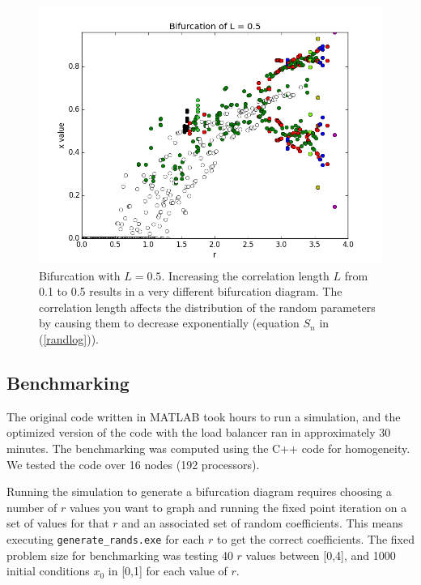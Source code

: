 \documentclass[12pt]{article}
\begin{document}
 \begin{figure}[H]
	\begin{center}
		\includegraphics[scale=0.5]{Bifurcation_L5}
\caption{Bifurcation with $L=0.5$. Increasing the correlation length
  $L$ from 0.1 to 0.5 results in a very different bifurcation
  diagram. The correlation length affects the distribution of the
  random parameters by causing them to decrease exponentially
  (equation $S_n$ in (\ref{randlog})).}\label{lb_bif_5}
	\end{center}
\end{figure}

\subsection{Benchmarking}
\hspace{5mm} The original code written in MATLAB took hours to run a
simulation, and the optimized version of the code with the load
balancer ran in approximately 30 minutes. The benchmarking was
computed using the C++ code for homogeneity. We tested the code over
16 nodes (192 processors). 

Running the simulation to generate a bifurcation diagram requires choosing a number of $r$ values you want to graph and running the fixed point
  iteration on a set of values for that $r$ and an associated set of
  random coefficients. This means executing
  \texttt{generate\_rands.exe} for each $r$ to get the correct
  coefficients. The fixed problem size for benchmarking was testing 40
  $r$ values between [0,4], and 1000 initial conditions $x_0$ in [0,1]
  for each value of $r$.
\end{document}
